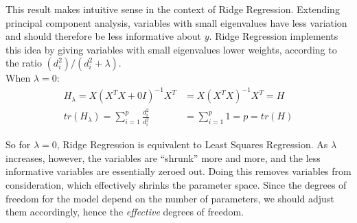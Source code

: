 \documentclass[a4paper]{article}
\begin{document}
This result makes intuitive sense in the context of Ridge Regression.
Extending principal component analysis,
variables with small eigenvalues have less variation and should
therefore be less informative about $y$. Ridge Regression implements
this idea by giving variables with small eigenvalues lower weights,
according to the ratio $(d_i^2)/(d_i^2+\lambda)$.\\ 

When $\lambda=0$:
\begin{align*}
  H_\lambda = X(X^TX + 0I)^{-1}X^T &= X(X^TX)^{-1}X^T = H\\
  tr(H_\lambda) = \sum\limits_{i=1}^p \frac{d_i^2}{d_i^2}&=\sum\limits_{i=1}^p 1 = p = tr(H)
\end{align*}


So for $\lambda=0$, Ridge Regression is equivalent to Least Squares
Regression.  As $\lambda$ increases, however, the
variables are ``shrunk'' more and more, and the less informative
variables are essentially zeroed out.  Doing this removes variables
from consideration, which effectively shrinks the parameter space.
Since the degrees of freedom for the model depend on the number of
parameters, we should adjust them accordingly, hence the
\emph{effective} degrees of freedom.
\end{document}
